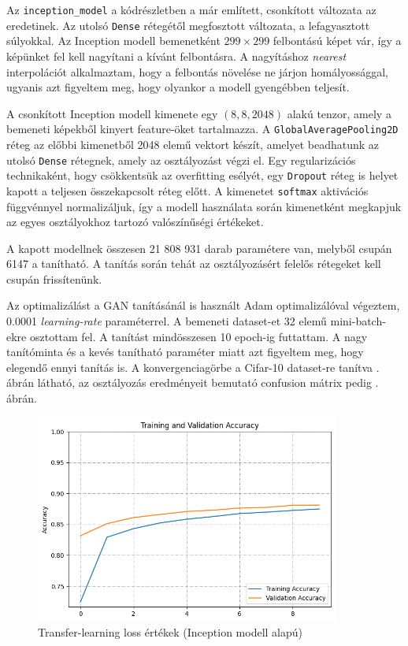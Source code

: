 Az \texttt{inception\_model} a kódrészletben a már említett, csonkított változata az eredetinek. Az utolsó \texttt{Dense} rétegétől megfosztott változata, a lefagyasztott súlyokkal. Az Inception modell bemenetként $299 \times 299$ felbontású képet vár, így a képünket fel kell nagyítani a kívánt felbontásra. A nagyításhoz \textit{nearest} interpolációt alkalmaztam, hogy a felbontás növelése ne járjon homályossággal, ugyanis azt figyeltem meg, hogy olyankor a modell gyengébben teljesít.

A csonkított Inception modell kimenete egy $(8, 8, 2048)$ alakú tenzor, amely a bemeneti képekből kinyert feature-öket tartalmazza. A \texttt{GlobalAveragePooling2D} réteg az előbbi kimenetből 2048 elemű vektort készít, amelyet beadhatunk az utolsó \texttt{Dense} rétegnek, amely az osztályozást végzi el. Egy regularizációs technikaként, hogy csökkentsük az overfitting esélyét, egy \texttt{Dropout} réteg is helyet kapott a teljesen összekapcsolt réteg előtt.
A kimenetet \texttt{softmax} aktivációs függvénnyel normalizáljuk, így a modell használata során kimenetként megkapjuk az egyes osztályokhoz tartozó valószínűségi értékeket.

A kapott modellnek összesen 21 808 931 darab paramétere van, melyből csupán 6147 a tanítható. A tanítás során tehát az osztályozásért felelős rétegeket kell csupán frissítenünk.

Az optimalizálást a GAN tanításánál is használt Adam optimalizálóval végeztem, 0.0001 \textit{learning-rate} paraméterrel. A bemeneti dataset-et 32 elemű mini-batch-ekre osztottam fel. A tanítást mindösszesen 10 epoch-ig futtattam. A nagy tanítóminta és a kevés tanítható paraméter miatt azt figyeltem meg, hogy elegendő ennyi tanítás is. A konvergenciagörbe a Cifar-10 dataset-re tanítva . ábrán látható, az osztályozás eredményeit bemutató confusion mátrix pedig . ábrán.

\begin{figure}[h]
	\centering
	\includegraphics[width=10cm]{images/transfer_inception.png}
	\caption{Transfer-learning loss értékek (Inception modell alapú)}
	\label{fig:transfer_learning_loss}
\end{figure}

